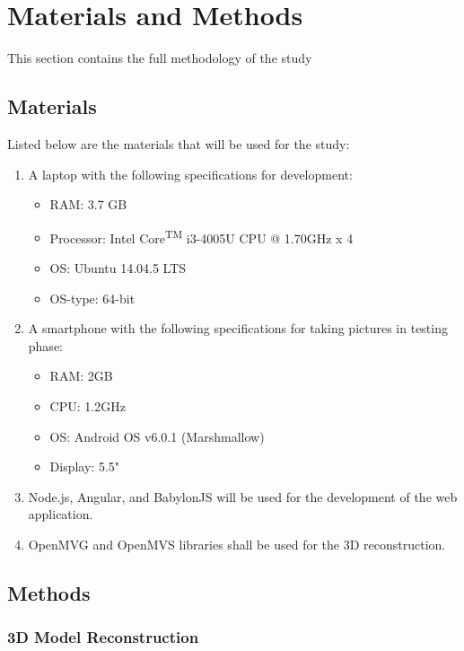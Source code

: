 \documentclass[journal]{./IEEE/IEEEtran}
\begin{document}
\section{Materials and Methods}
This section contains the full methodology of the study

\subsection{Materials}
Listed below are the materials that will be used for the study:
\begin{enumerate}
    \item A laptop with the following specifications for development:
        \begin{itemize}
            \item RAM: 3.7 GB
            \item Processor: Intel\textsuperscript{\textregistered} Core\textsuperscript{TM} i3-4005U CPU @ 1.70GHz x 4
            \item OS: Ubuntu 14.04.5 LTS
            \item OS-type: 64-bit
        \end{itemize}
        
    \item A smartphone with the following specifications for taking pictures in testing phase:
        \begin{itemize}
            \item RAM: 2GB
            \item CPU: 1.2GHz
            \item OS: Android OS v6.0.1 (Marshmallow)
            \item Display: 5.5"
        \end{itemize}
        
    \item Node.js, Angular, and BabylonJS will be used for the development of the web application.
    
    \item OpenMVG and OpenMVS libraries shall be used for the 3D reconstruction.
\end{enumerate}

\subsection{Methods}
    \subsubsection*{3D Model Reconstruction}
\end{document}

